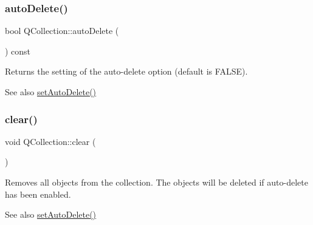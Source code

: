 \subsubsection{\texorpdfstring{autoDelete()}{autoDelete()}}
{\footnotesize\ttfamily bool Q\+Collection\+::auto\+Delete (\begin{DoxyParamCaption}{ }\end{DoxyParamCaption}) const\hspace{0.3cm}{\ttfamily [inline]}}

Returns the setting of the auto-\/delete option (default is F\+A\+L\+SE). \begin{DoxySeeAlso}{See also}
\mbox{\hyperlink{class_q_collection_a6ed41913c76bfba54be6da26015ee3f3}{set\+Auto\+Delete()}} 
\end{DoxySeeAlso}
\mbox{\label{class_q_collection_a92416cc22907550389aad04c26be2f77}} 
\subsubsection{\texorpdfstring{clear()}{clear()}}
{\footnotesize\ttfamily void Q\+Collection\+::clear (\begin{DoxyParamCaption}{ }\end{DoxyParamCaption})\hspace{0.3cm}{\ttfamily [pure virtual]}}

Removes all objects from the collection. The objects will be deleted if auto-\/delete has been enabled. \begin{DoxySeeAlso}{See also}
\mbox{\hyperlink{class_q_collection_a6ed41913c76bfba54be6da26015ee3f3}{set\+Auto\+Delete()}} 
\end{DoxySeeAlso}


